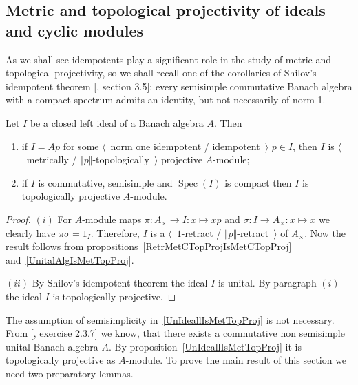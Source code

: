
\subsection{
    Metric and topological projectivity of ideals and cyclic modules}
\label{SubSectionMetricAndTopologicalProjectivityOfIdealsAndCyclicModules}

As we shall see idempotents play a significant role in the study of metric and
topological projectivity, so we shall recall one of the corollaries of Shilov's
idempotent theorem [\cite{KaniBanAlg}, section 3.5]: every semisimple
commutative Banach algebra with a compact spectrum admits an identity, but not
necessarily of norm 1. 

\begin{proposition}\label{UnIdeallIsMetTopProj} Let $I$ be a closed left ideal of a
Banach algebra $A$. Then

\begin{enumerate}[label = (\roman*)]
    \item if $I=Ap$ for some $\langle$~norm one idempotent /
    idempotent~$\rangle$ $p\in I$, then $I$ is $\langle$~metrically / 
    $\Vert p\Vert$-topologically~$\rangle$ projective $A$-module;

    \item if $I$ is commutative, semisimple and $\operatorname{Spec}(I)$ is
    compact then $I$ is topologically projective $A$-module.
\end{enumerate}
\end{proposition}
\begin{proof} 
$(i)$ For $A$-module maps $\pi:A_\times\to I:x\mapsto xp$ and 
$\sigma:I\to A_\times:x\mapsto x$ we clearly have $\pi\sigma=1_I$. 
Therefore, $I$ is a $\langle$~$1$-retract / $\Vert p\Vert$-retract~$\rangle$ 
of $A_\times$. Now the result follows from 
propositions~\ref{RetrMetCTopProjIsMetCTopProj} and~\ref{UnitalAlgIsMetTopProj}.

$(ii)$ By Shilov's idempotent theorem the ideal $I$ is unital. 
By paragraph $(i)$ the ideal $I$ is topologically projective.
\end{proof}

The assumption of semisimplicity in~\ref{UnIdeallIsMetTopProj} is not necessary.
From [\cite{DalesIntroBanAlgOpHarmAnal}, exercise 2.3.7] we know, that there
exists a commutative non semisimple unital Banach algebra $A$. By
proposition~\ref{UnIdeallIsMetTopProj} it is topologically projective as
$A$-module. To prove the main result of this section we need two preparatory
lemmas.

